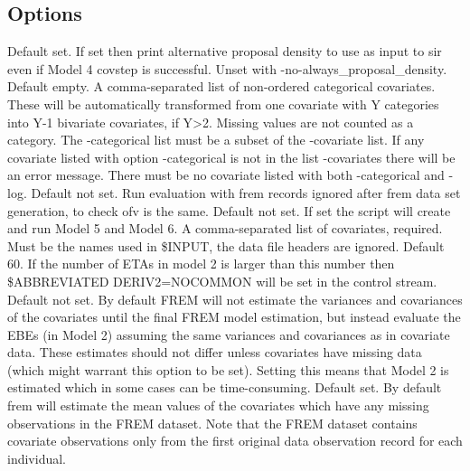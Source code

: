 \subsection{Options}
\begin{optionlist}
Default set. If set then print alternative proposal density to use as input to sir even if Model 4 covstep is successful.
Unset with -no-always\_proposal\_density.
\nextopt
{}
Default empty. A comma-separated list of non-ordered categorical covariates. These will be automatically transformed from
one covariate with Y categories into Y-1 bivariate covariates, if Y>2. Missing values are not counted as a category.
The -categorical list must be a subset of the -covariate list. If any covariate listed with option -categorical is not
in the list -covariates there will be an error message. There must be no covariate listed with both -categorical and -log.
\nextopt
{}
Default not set. Run evaluation with frem records ignored after frem data set generation, to check ofv is the same.
\nextopt
{}
Default not set. If set the script will create and run Model 5 and Model 6.
\nextopt
{}
A comma-separated list of covariates, required. Must be the names used in \$INPUT, the data file headers are ignored.
\nextopt
{}
Default 60. If the number of ETAs in model 2 is larger than this number then\\
\$ABBREVIATED DERIV2=NOCOMMON will be set in the control stream.
\nextopt
{}
Default not set. By default FREM will not estimate the variances and covariances of the covariates until the final FREM model estimation,
but instead evaluate the EBEs (in Model 2) assuming the same variances and covariances as in covariate data.
These estimates should not differ unless covariates have missing data (which might warrant this option to be set).
Setting this means that Model 2 is estimated which in some cases can be time-consuming.
\nextopt
{}
Default set. By default frem will estimate the mean values of the covariates which have any
missing observations in the FREM dataset. Note that the FREM dataset contains covariate
observations only from the first original data observation record for each individual.

\end{optionlist}
